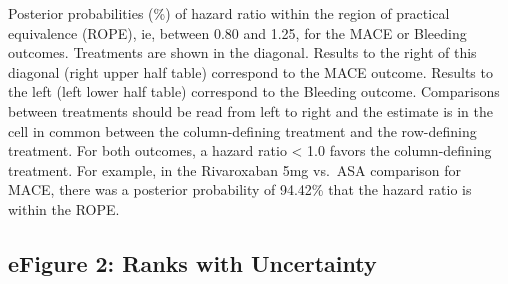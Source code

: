 \documentclass[
  12pt,
]{article}
\begin{document}
\begin{landscape}
\begin{table}[!h]
\centering
{}
\end{table}

Posterior probabilities (\%) of hazard ratio within the region of
practical equivalence (ROPE), ie, between 0.80 and 1.25, for the MACE or
Bleeding outcomes. Treatments are shown in the diagonal. Results to the
right of this diagonal (right upper half table) correspond to the MACE
outcome. Results to the left (left lower half table) correspond to the
Bleeding outcome. Comparisons between treatments should be read from
left to right and the estimate is in the cell in common between the
column-defining treatment and the row-defining treatment. For both
outcomes, a hazard ratio \textless{} 1.0 favors the column-defining
treatment. For example, in the Rivaroxaban 5mg vs.~ASA comparison for
MACE, there was a posterior probability of 94.42\% that the hazard ratio
is within the ROPE.

\end{landscape}

\hypertarget{efigure-2-ranks-with-uncertainty}{%
\subsection{eFigure 2: Ranks with
Uncertainty}\label{efigure-2-ranks-with-uncertainty}}
\end{document}
